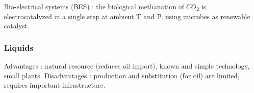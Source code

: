 \documentclass[../main.tex]{subfiles}
\begin{document}
Bio-electrical systems (BES) : the biological methanation of $CO_2$ is electrocatalyzed in a single step at ambient T and P, using microbes as renewable catalyst. \\

\subsubsection{Liquids}
Advantages : natural resource (reduces oil import), known and simple technology, small plants. Disadvantages : production and substitution (for oil) are limited, requires important infrastructure. \\
\end{document}
